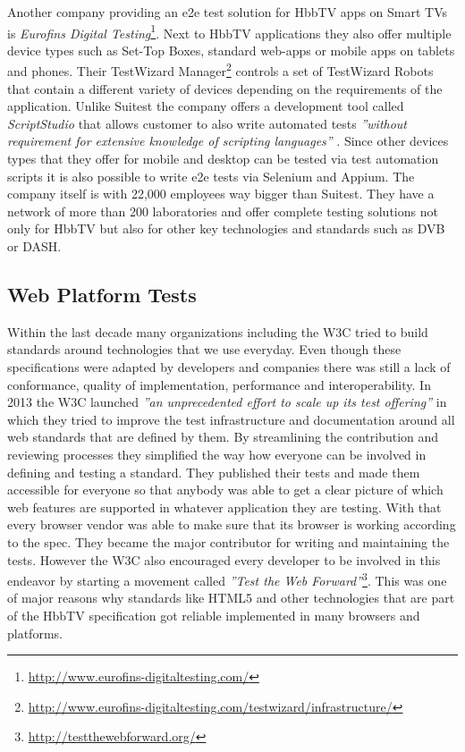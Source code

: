 Another company providing an e2e test solution for HbbTV apps on Smart TVs is \textit{Eurofins Digital Testing}\footnote{\url{http://www.eurofins-digitaltesting.com/}}. Next to HbbTV applications they also offer multiple device types such as Set-Top Boxes, standard web-apps or mobile apps on tablets and phones. Their TestWizard Manager\footnote{\url{http://www.eurofins-digitaltesting.com/testwizard/infrastructure/}} controls a set of TestWizard Robots that contain a different variety of devices depending on the requirements of the application. Unlike Suitest the company offers a development tool called \textit{ScriptStudio} that allows customer to also write automated tests \textit{''without requirement for extensive knowledge of scripting languages''} \cite{scriptstudio}. Since other devices types that they offer for mobile and desktop can be tested via test automation scripts it is also possible to write e2e tests via Selenium and Appium. The company itself is with 22,000 employees way bigger than Suitest. They have a network of more than 200 laboratories and offer complete testing solutions not only for HbbTV but also for other key technologies and standards such as DVB or DASH.

\subsection{Web Platform Tests}

Within the last decade many organizations including the W3C tried to build standards around technologies that we use everyday. Even though these specifications were adapted by developers and companies there was still a lack of conformance, quality of implementation, performance and interoperability. In 2013 the W3C launched \textit{''an unprecedented effort to scale up its test offering''} \cite{w3ctesting} in which they tried to improve the test infrastructure and documentation around all web standards that are defined by them. By streamlining the contribution and reviewing processes they simplified the way how everyone can be involved in defining and testing a standard. They published their tests and made them accessible for everyone so that anybody was able to get a clear picture of which web features are supported in whatever application they are testing. With that every browser vendor was able to make sure that its browser is working according to the spec. They became the major contributor for writing and maintaining the tests. However the W3C also encouraged every developer to be involved in this endeavor by starting a movement called \textit{''Test the Web Forward''}\footnote{\url{http://testthewebforward.org/}}. This was one of major reasons why standards like HTML5 and other technologies that are part of the HbbTV specification got reliable implemented in many browsers and platforms.

